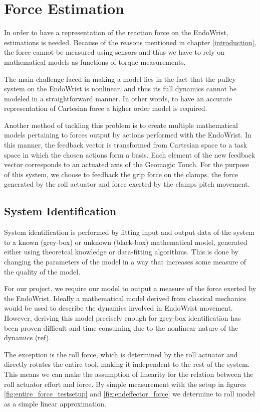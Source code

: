 \chapter{Force Estimation}
In order to have a representation of the reaction force on the EndoWrist, estimations is needed.
Because of the reasons mentioned in chapter \ref{introduction}, the force cannot be measured using sensors and thus we have to rely on mathematical models as functions of torque measurements.

The main challenge faced in making a model lies in the fact that the pulley system on the EndoWrist is nonlinear, and thus its full dynamics cannot be modeled in a straightforward manner. 
In other words, to have an accurate representation of Cartesian force a higher order model is required.

Another method of tackling this problem is to create multiple mathematical models pertaining to forces output by actions performed with the EndoWrist.
In this manner, the feedback vector is transformed from Cartesian space to a task space in which the chosen actions form a basis.
Each element of the new feedback vector corresponds to an actuated axis of the Geomagic Touch.
For the purpose of this system, we choose to feedback the grip force on the clamps, the force generated by the roll actuator and force exerted by the clamps pitch movement.

\section{System Identification}
System identification is performed by fitting input and output data of the system to a known (grey-box) or unknown (black-box) mathematical model, generated either using theoretcal knowledge or data-fitting algorithms. 
This is done by changing the parameters of the model in a way that increases some measure of the quality of the model.

For our project, we require our model to output a measure of the force exerted by the EndoWrist.
Ideally a mathematical model derived from classical mechanics would be used to describe the dynamics involved in EndoWrist movement.
However, deriving this model precisely enough for grey-box identification has been proven difficult and time consuming due to the nonlinear nature of the dynamics (ref).

The exception is the roll force, which is determined by the roll actuator and directly rotates the entire tool, making it independent to the rest of the system.
This means we can make the assumption of linearity for the relation between the roll actuator effort and force.  
By simple measurement with the setup in figures \ref{fig:entire_force_testsetup} and \ref{fig:endeffector_force} we determine to roll model as a simple
linear approximation.

